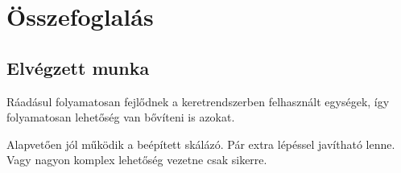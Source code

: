 \chapter{Összefoglalás}
\label{sec:summary}


\section{Elvégzett munka}




Ráadásul folyamatosan fejlődnek a keretrendszerben felhasznált egységek, így folyamatosan lehetőség van bővíteni is azokat.

Alapvetően jól működik a beépített skálázó.
Pár extra lépéssel javítható lenne.
Vagy nagyon komplex lehetőség vezetne csak sikerre.



